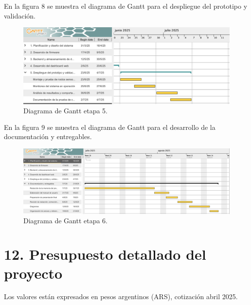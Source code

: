 \documentclass[
11pt, %
]{charter}
\begin{document}
    \newpage

En la figura 8 se muestra el diagrama de Gantt para el despliegue del prototipo y validación.
\begin{figure}[htpb]
    \centering 
    \includegraphics[width=1.05\textwidth]{./Figuras/gantt6.png}
    \caption{Diagrama de Gantt etapa 5.}
    \label{fig:AoN}
    \end{figure}

En la figura 9 se muestra el diagrama de Gantt para el desarrollo de la documentación y entregables.
\begin{figure}[htpb]
    \centering 
    \includegraphics[width=1.05\textwidth]{./Figuras/gantt7.png}
    \caption{Diagrama de Gantt etapa 6.}
    \label{fig:AoN}
    \end{figure}


    \newpage

\section{12. Presupuesto detallado del proyecto}
\label{sec:presupuesto}
Los valores están expresados en pesos argentinos (ARS), cotización abril 2025.
\end{document}
